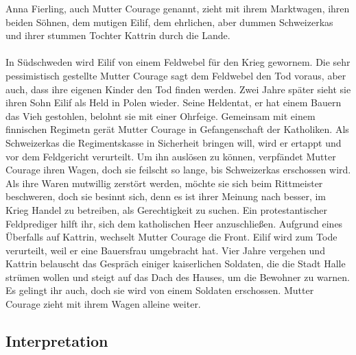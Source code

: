 \documentclass[a4paper]{article}
\begin{document}
	Anna Fierling, auch Mutter Courage genannt, zieht mit ihrem Marktwagen, ihren beiden Söhnen, dem mutigen Eilif, dem ehrlichen, aber dummen Schweizerkas und ihrer stummen Tochter Kattrin durch die Lande.\\\\
        In Südschweden wird Eilif von einem Feldwebel für den Krieg gewornem. Die sehr pessimistisch gestellte Mutter Courage sagt dem Feldwebel den Tod voraus, aber auch, dass ihre eigenen Kinder den Tod finden werden. Zwei Jahre später sieht sie ihren Sohn Eilif als Held in Polen wieder. Seine Heldentat, er hat einem Bauern das Vieh gestohlen, belohnt sie mit einer Ohrfeige. Gemeinsam mit einem finnischen Regimetn gerät Mutter Courage in Gefangenschaft der Katholiken. Als Schweizerkas die Regimentskasse in Sicherheit bringen will, wird er ertappt und vor dem Feldgericht verurteilt. Um ihn auslösen zu können, verpfändet Mutter Courage ihren Wagen, doch sie feilscht so lange, bis Schweizerkas erschossen wird. Als ihre Waren mutwillig zerstört werden, möchte sie sich beim Rittmeister beschweren, doch sie besinnt sich, denn es ist ihrer Meinung nach besser, im Krieg Handel zu betreiben, als Gerechtigkeit zu suchen. Ein protestantischer Feldprediger hilft ihr, sich dem katholischen Heer anzuschließen. Aufgrund eines Überfalls auf Kattrin, wechselt Mutter Courage die Front. Eilif wird zum Tode verurteilt, weil er eine Bauersfrau umgebracht hat. Vier Jahre vergehen und Kattrin belauscht das Gespräch einiger kaiserlichen Soldaten, die die Stadt Halle strümen wollen und steigt auf das Dach des Hauses, um die Bewohner zu warnen. Es gelingt ihr auch, doch sie wird von einem Soldaten erschossen. Mutter Courage zieht mit ihrem Wagen alleine weiter.
        
        \subsection{Interpretation}
\end{document}
